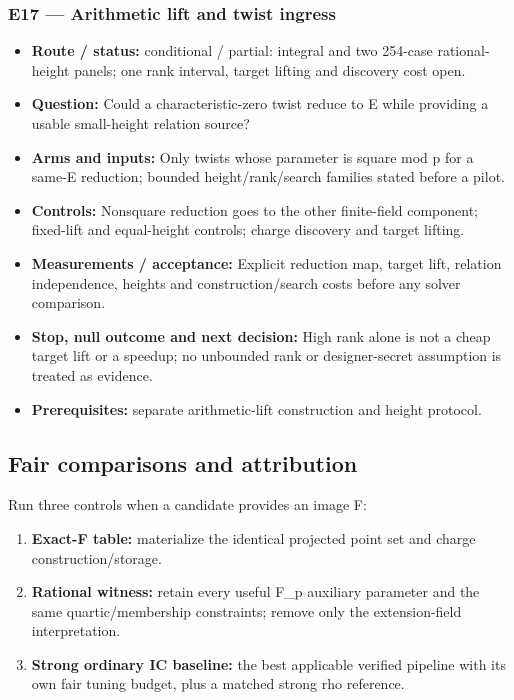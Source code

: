 \documentclass[
  10pt,
]{article}
\providecommand{\tightlist}{%
  \setlength{\itemsep}{0pt}\setlength{\parskip}{0pt}}
\begin{document}
\subsubsection{E17 --- Arithmetic lift and twist
ingress}\label{e17-arithmetic-lift-and-twist-ingress}

\begin{itemize}
\tightlist
\item
  \textbf{Route / status:} conditional / partial: integral and two
  254-case rational-height panels; one rank interval, target lifting and
  discovery cost open.
\item
  \textbf{Question:} Could a characteristic-zero twist reduce to E while
  providing a usable small-height relation source?
\item
  \textbf{Arms and inputs:} Only twists whose parameter is square mod p
  for a same-E reduction; bounded height/rank/search families stated
  before a pilot.
\item
  \textbf{Controls:} Nonsquare reduction goes to the other finite-field
  component; fixed-lift and equal-height controls; charge discovery and
  target lifting.
\item
  \textbf{Measurements / acceptance:} Explicit reduction map, target
  lift, relation independence, heights and construction/search costs
  before any solver comparison.
\item
  \textbf{Stop, null outcome and next decision:} High rank alone is not
  a cheap target lift or a speedup; no unbounded rank or designer-secret
  assumption is treated as evidence.
\item
  \textbf{Prerequisites:} separate arithmetic-lift construction and
  height protocol.
\end{itemize}

\subsection{Fair comparisons and
attribution}\label{fair-comparisons-and-attribution}

Run three controls when a candidate provides an image F:

\begin{enumerate}
\def\labelenumi{\arabic{enumi}.}
\tightlist
\item
  \textbf{Exact-F table:} materialize the identical projected point set
  and charge construction/storage.
\item
  \textbf{Rational witness:} retain every useful F\_p auxiliary
  parameter and the same quartic/membership constraints; remove only the
  extension-field interpretation.
\item
  \textbf{Strong ordinary IC baseline:} the best applicable verified
  pipeline with its own fair tuning budget, plus a matched strong rho
  reference.
\end{enumerate}
\end{document}
